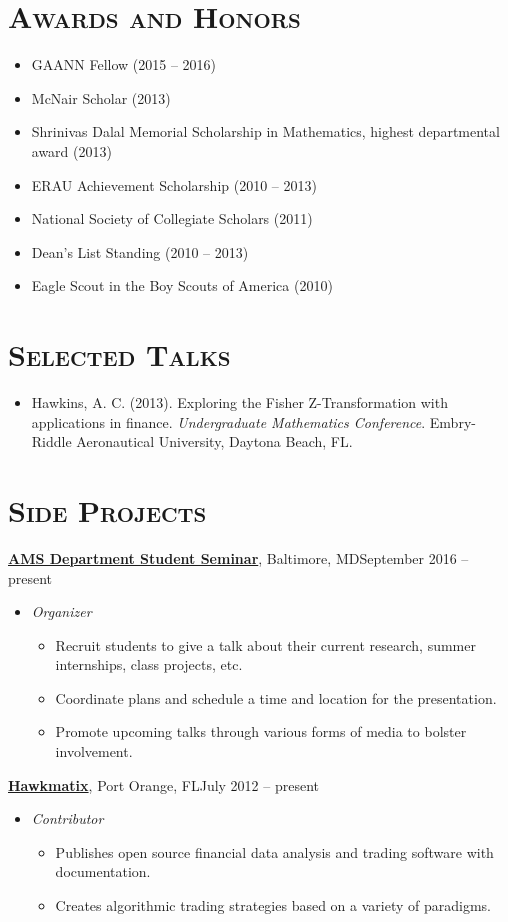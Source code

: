 \documentclass[10pt]{article}
\begin{document}
\section*{\textsc{Awards and Honors}}
\begin{itemize}
    \item GAANN Fellow (2015 -- 2016)
    \item McNair Scholar (2013)
    \item Shrinivas Dalal Memorial Scholarship in Mathematics, highest departmental award (2013)
    \item ERAU Achievement Scholarship (2010 -- 2013)
    \item National Society of Collegiate Scholars (2011)
    \item Dean's List Standing (2010 -- 2013)
    \item Eagle Scout in the Boy Scouts of America (2010)
\end{itemize}

\section*{\textsc{Selected Talks}}
\begin{itemize}[leftmargin=*]
    \item[] Hawkins, A. C. (2013). Exploring the Fisher Z-Transformation with applications in finance. \textit{Undergraduate Mathematics Conference}. Embry-Riddle Aeronautical University, Daytona Beach, FL.
\end{itemize}

\section*{\textsc{Side Projects}}
\textbf{\href{http://www.ams.jhu.edu/~ahawki14/student_seminar}{AMS Department Student Seminar}}, Baltimore, MD\hfill September 2016 -- present
\begin{itemize}[noitemsep]
    \item[] \textit{Organizer}
    \begin{itemize}[noitemsep]
        \item Recruit students to give a talk about their current research, summer internships, class projects, etc.
        \item Coordinate plans and schedule a time and location for the presentation.
        \item Promote upcoming talks through various forms of media to bolster involvement.
    \end{itemize}
\end{itemize}
\textbf{\href{www.hawkmatix.com}{Hawkmatix}}, Port Orange, FL\hfill July 2012 -- present
\begin{itemize}[noitemsep]
    \item[] \textit{Contributor}
    \begin{itemize}[noitemsep]
        \item Publishes open source financial data analysis and trading software with documentation.
        \item Creates algorithmic trading strategies based on a variety of paradigms.
    \end{itemize}
\end{itemize}
\end{document}
